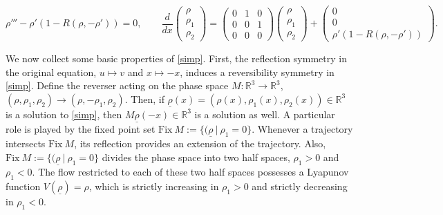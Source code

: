 \documentclass[10pt]{article}
\newcommand{\R}{\mathbb{R}}
\begin{document}
\begin{equation}
\rho'''- \rho'(1-R(\rho,-\rho'))=0, \qquad \frac{d}{dx}\begin{pmatrix} \rho \\ \rho_1 \\ \rho_2 \end{pmatrix} =  \begin{pmatrix} 0 & 1 & 0\\ 0 & 0 & 1\\ 0 & 0 & 0 \end{pmatrix} \begin{pmatrix}\rho \\ \rho_1 \\ \rho_2  \end{pmatrix} + \begin{pmatrix} 0 \\0\\ \rho'(1-R(\rho,-\rho'))\end{pmatrix}.
\label{simp}
\end{equation}

We now collect some basic properties of \eqref{simp}. First, the reflection symmetry in the original equation,  $u \mapsto v$ and $x \mapsto -x$, induces a reversibility symmetry in  \eqref{simp}. Define the reverser acting on the phase space $M:\R^3\to\R^3$, $(\rho,\rho_1,\rho_2)\to (\rho,-\rho_1,\rho_2)$. Then, if $\underline{\rho}(x)=(\rho(x),\rho_1(x),\rho_2(x))\in\R^3$ is a solution to \eqref{simp}, then $M\underline{\rho}(-x)\in\R^3$ is a solution as well. A particular role is played by the fixed point set  $\text{Fix}\ M := \{( \underline{\rho} \ | \ \rho_1 = 0\}$.  Whenever a trajectory intersects $\text{Fix}\ M$, its reflection provides an extension of the trajectory. Also, $\text{Fix}\ M := \{( \underline{\rho} \ | \ \rho_1 = 0\}$ divides the phase space into two half spaces, $\rho_1>0$ and $\rho_1<0$. The flow restricted to each of these two half spaces possesses a Lyapunov function $V(\underline{\rho})=\rho$, which is strictly increasing in $\rho_1>0$ and strictly decreasing in $\rho_1<0$. 
\end{document}
